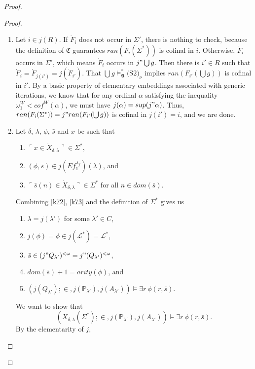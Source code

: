 \documentclass[12pt, twoside]{memoir}
\numberwithin{equation}{section}
\theoremstyle{definition}
\theoremstyle{remark}
\theoremstyle{definition}
\theoremstyle{definition}
\theoremstyle{definition}
\theoremstyle{remark}
\newcommand{\eq}{=}
\begin{document}
\begin{proof}
\begin{proof}
\begin{enumerate}[label=<$k$> $\eq$ \arabic* :, leftmargin=70pt]
    \addtocounter{enumi}{1}
    \item Let $i \in j(R)$. If $\dot{F}_i$ does not occur in $\Sigma'$, there is nothing to check, because the definition of $\mathfrak{C}$ guarantees $ran(F_i(\Sigma^*))$ is cofinal in $i$. Otherwise, $\dot{F}_i$ occurs in $\Sigma'$, which means $\dot{F}_i$ occurs in $j" \bigcup g$. Then there is $i' \in R$ such that $\dot{F}_i = \dot{F}_{j(i')} = j(\dot{F}_{i'})$. That $\bigcup g \models^*_{\mathfrak{A}} \text{(S2)}_{\nu}$ implies $ran(F_{i'}(\bigcup g))$ is cofinal in $i'$. By a basic property of elementary embeddings associated with generic iterations, we know that for any ordinal $\alpha$ satisfying the inequality $\omega_1^W < cof^{W}(\alpha)$, we must have $j(\alpha) = sup(j" \alpha)$. Thus, $ran(F_i(\Sigma^*)) = j" ran(F_{i'}(\bigcup g))$ is cofinal in $j(i') = i$, and we are done.
    \addtocounter{enumi}{4}
    \item\label{k7m} Let $\delta$, $\lambda$, $\phi$, $\bar{s}$ and $x$ be such that 
    \begin{enumerate}[label=(K7.\arabic*), leftmargin=50pt]
        \item $\ulcorner x \in \dot{X}_{\delta, \lambda} \urcorner \in \Sigma^*$,
        \item\label{k72} $(\phi, \bar{s}) \in j(Ef_1^{\lambda_f})(\lambda)$, and
        \item\label{k73} $\ulcorner \bar{s}(n) \in \dot{X}_{\delta, \lambda} \urcorner \in \Sigma^*$ for all $n \in dom(\bar{s})$.
    \end{enumerate}
    Combining \ref{k72}, \ref{k73} and the definition of $\Sigma^*$ gives us 
    \begin{enumerate}[label=(\alph*)]
        \item $\lambda = j(\lambda')$ for some $\lambda' \in C$,
        \item $j(\phi) = \phi \in j(\mathcal{L}^*) = \mathcal{L}^*$,
        \item $\bar{s} \in (j" Q_{\lambda'})^{< \omega} = j" (Q_{\lambda'})^{< \omega}$,
        \item $dom(\bar{s}) + 1 = arity(\phi)$, and
        \item $(j(Q_{\lambda'}); \in, j(\mathbb{P}_{\lambda'}), j(A_{\lambda'})) \models \exists r \ \phi(r, \bar{s})$.
    \end{enumerate}
    We want to show that $$(X_{\delta, \lambda}(\Sigma^*); \in, j(\mathbb{P}_{\lambda'}), j(A_{\lambda'})) \models \exists r \ \phi(r, \bar{s}).$$ By the elementarity of $j$, 

\end{enumerate}
\end{proof}
\end{proof}
\end{document}

